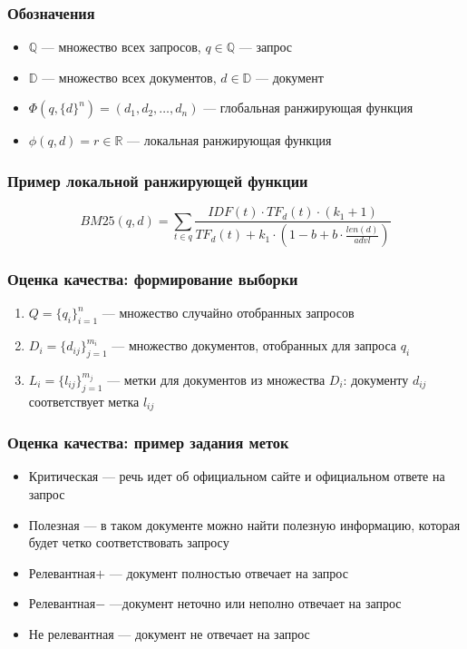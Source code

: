\documentclass[unicode, notheorems]{beamer}
\begin{document}
\begin{frame}

\frametitle{Обозначения}

\begin{itemize}
\item $\mathbb Q$ --- множество всех запросов, $q \in \mathbb Q$ --- запрос
\item $\mathbb D$ --- множество всех документов, $d \in \mathbb D$ --- документ
\item $\Phi(q, \{d\}^{n}) = (d_1, d_2, \ldots, d_n)$ --- глобальная ранжирующая функция
\item $\phi(q, d) = r \in \mathbb R$ --- локальная ранжирующая функция
\end{itemize}

\end{frame}


\begin{frame}

\frametitle{Пример локальной ранжирующей функции}

\begin{equation*}
BM25(q, d) = \sum_{t \in q}{\frac{IDF(t) \cdot TF_d(t) \cdot (k_1 + 1)}{TF_d(t) + k_1 \cdot (1 - b + b \cdot \frac{len(d)}{advl})}}
\end{equation*}

\end{frame}

\begin{frame}
\frametitle{Оценка качества: формирование выборки}

\begin{enumerate}
\item $Q = \{q_i\}_{i=1}^{n}$ --- множество случайно отобранных запросов
\item $D_i = \{d_{ij}\}_{j=1}^{m_i}$ --- множество документов, отобранных для запроса $q_i$
\item $L_i = \{l_{ij}\}_{j=1}^{m_j}$ --- метки для документов из множества $D_i$: документу $d_{ij}$  соответствует метка $l_{ij}$
\end{enumerate}

\end{frame}

\begin{frame}
\frametitle{Оценка качества: пример задания меток}

\begin{itemize}
\item Критическая --- речь идет об официальном сайте и официальном ответе на запрос
\item Полезная --- в таком документе можно найти полезную информацию, которая будет четко соответствовать запросу
\item Релевантная$+$ --- документ полностью отвечает на запрос
\item Релевантная$-$ ---документ неточно или неполно отвечает на запрос
\item Не релевантная --- документ не отвечает на запрос
\end{itemize}

\end{frame}
\end{document}
